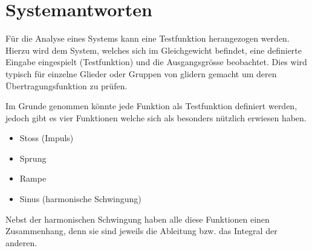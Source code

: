 \section{Systemantworten}
Für die Analyse eines Systems kann eine Testfunktion herangezogen
werden. Hierzu wird dem System, welches sich im Gleichgewicht
befindet, eine definierte Eingabe eingespielt (Testfunktion) und
die Ausgangsgrösse beobachtet. Dies wird typisch für einzelne
Glieder oder Gruppen von glidern gemacht um deren 
Übertragungsfunktion zu prüfen.

Im Grunde genommen könnte jede Funktion als Testfunktion definiert
werden, jedoch gibt es vier Funktionen welche sich als besonders
nützlich erwiesen haben.
%
\begin{itemize}
	\item Stoss (Impuls)
    \item Sprung
    \item Rampe
    \item Sinus (harmonische Schwingung)
\end{itemize}
%
Nebst der harmonischen Schwingung haben alle diese Funktionen
einen Zusammenhang, denn sie sind jeweils die Ableitung bzw. das
Integral der anderen.

